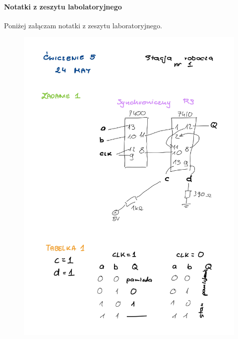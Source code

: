 \documentclass[14pt, table]{extarticle}
\begin{document}
\newpage
\paragraph{Notatki z zeszytu labolatoryjnego \\}
Poniżej załączam notatki z zeszytu laboratoryjnego.

\begin{figure}[H]
\includegraphics[scale=0.2]{B0}
\centering
\captionsetup{labelformat=empty}
\caption{}
\end{figure}
\end{document}
